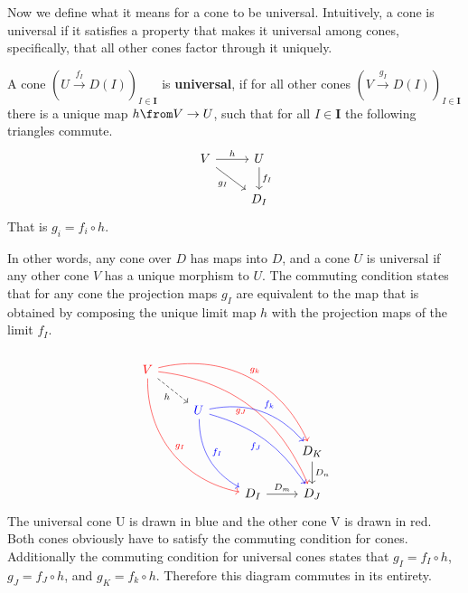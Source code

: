 
Now we define what it means for a cone to be universal. Intuitively,
a cone is universal if it satisfies a property that makes it universal among cones,
specifically, that all other cones factor through it uniquely.

\begin{definition}
  A cone $(U \overset{f_I}{\to} D(I))_{I\in \bm{I}}$ is \textbf{universal}, if
  for all other cones $(V \overset{g_I}{\to} D(I))_{I\in \bm{I}}$ there is a unique
  map $h \from V \to U$, such that for all $I \in \bm{I}$
  the following triangles commute.
  \[
    \begin{tikzcd}
      V \arrow[dr, swap, "g_I"] \arrow{r}{h} & U \arrow{d}{f_I} \\
      & D_I
    \end{tikzcd}
  \]
  That is $g_i = f_i \circ h$.
\end{definition}

In other words, any cone over $D$ has maps into $D$, and a cone $U$ is universal if
any other cone $V$ has a unique morphism to $U$.
The commuting condition states that for any cone the projection maps $g_I$ are equivalent
to the map that is obtained by composing the unique limit map $h$ with the
projection maps of the limit $f_I$.

\begin{example}
    \[
    \begin{tikzcd}
      {\color{red}V}
      \arrow[bend right=40,color=red]{dddrr}{g_I}
      \arrow[bend left=40, color=red]{ddrrr}{g_k}
      \arrow[bend left=30, color=red, swap]{dddrrr}{g_J}
      \arrow[dashed,swap]{dr}{h}
      & & & \\
      & {\color{blue}U}
      \arrow[bend right=30,color=blue]{ddr}{f_I}
      \arrow[bend left=30, color=blue]{drr}{f_k}
      \arrow[bend left=20, color=blue, swap]{ddrr}{f_J}&   &\\
      & & & D_K \arrow{d}{D_n} \\
      & & D_I \arrow{r}{D_m} & D_J
    \end{tikzcd}
  \]
  The universal cone {\color{blue}U}
  is drawn in blue and the other cone {\color{red}V} is drawn in red.
  Both cones obviously have to satisfy the commuting condition for cones.
  Additionally the commuting condition for universal cones states that
  $g_I = f_I \circ h$, $g_J = f_J \circ h$, and $g_K = f_k \circ h$.
  Therefore this diagram commutes in its entirety.
\end{example}

